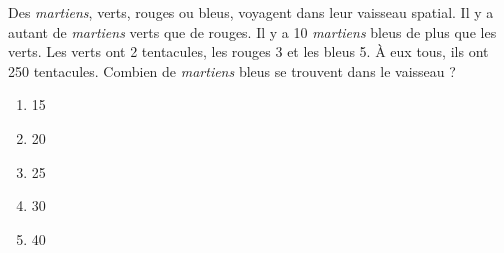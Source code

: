 Des {\em martiens}, verts, rouges ou bleus, voyagent dans leur vaisseau
spatial. Il y a autant de {\em martiens} verts que de rouges. Il y a 10
{\em martiens} bleus de plus que les verts. Les verts ont 2 tentacules, les
rouges 3 et les bleus 5. \`A eux tous, ils ont 250 tentacules. Combien
de {\em martiens} bleus se trouvent dans le vaisseau ?
\begin{multicols}{5}
  \begin{enumerate}[A/]
  \item 15
  \item 20
  \item 25
  \item 30
  \item 40
  \end{enumerate}
\end{multicols}